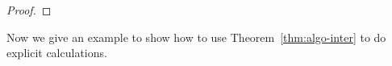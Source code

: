 \documentclass[12pt,reqno]{amsart}
\DeclareMathOperator{\Aut}{Aut}
\theoremstyle{plain}
\theoremstyle{definition}
\theoremstyle{remark}
\begin{document}
\begin{proof}
\end{proof}



Now we give an  example to show how to use Theorem~\ref{thm:algo-inter} to do explicit calculations.
\end{document}
